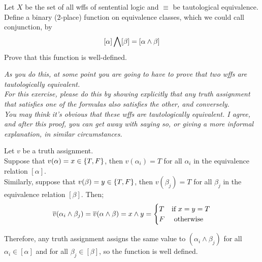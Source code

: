 \begin{problem}
  Let $X$ be the set of all wffs of sentential logic
  and $\equiv$ be tautological equivalence.
  Define a binary ($2$-place) function on equivalence classes,
  which we could call conjunction, by
  \[ [\alpha ] \bigwedge [\beta ] = [\alpha \land \beta ] \]
Prove that this function is well-defined.

\step
\emph{
  As you do this, at some point you are going to have to prove that two
  wffs are tautologically equivalent.\\
  For this exercise, please do this by showing
  explicitly that any truth assignment that satisfies one of the formulas also
  satisfies the other, and conversely.\\
  You may think it’s obvious that these wffs are tautologically equivalent.
  I agree, and after this proof, you can get away with saying so, or giving a
  more informal explanation, in similar circumstances.
}
\end{problem}
\begin{Answer}

  \step
  Let $v$ be a truth assignment.\\
  Suppose that $v(\alpha) = x \in \left\{T, F\right\}$, then $v(\alpha_i) = T$ for all $\alpha_i$ in the
  equivalence relation $[\alpha]$.\\
  Similarly, suppose that $v(\beta) = y \in \left\{T, F\right\}$, then $v(\beta_j) = T$ for all $\beta_j$ in the
  equivalence relation $[\beta]$.
  Then;
  \begin{align*}
    \overline{v}(\alpha_i \land \beta_j) = \overline{v}(\alpha \land \beta) = x \land y = \begin{cases}
      T & \text{if } x = y = T \\
      F & \text{ otherwise }
    \end{cases}
  \end{align*}

  \step
  Therefore, any truth assignment assigns the same value to
  $(\alpha_i \land \beta_j)$ for all $\alpha_i \in [\alpha]$ and for all $\beta_j \in [\beta]$,
  so the function is well defined.
\end{Answer}
